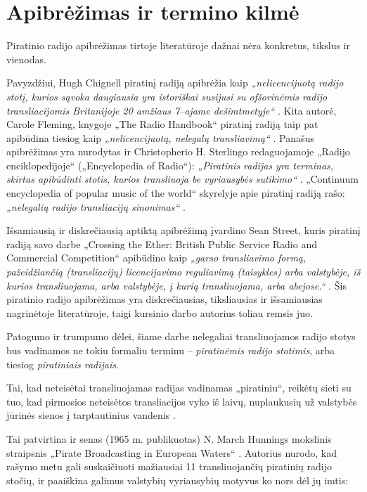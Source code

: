 \documentclass[kursinis-darbas]{vukf}
\begin{document}
\section{Apibrėžimas ir termino kilmė}

Piratinio radijo apibrėžimas tirtoje literatūroje dažnai nėra konkretus, tikslus ir vienodas.

Pavyzdžiui, Hugh Chignell piratinį radiją apibrėžia kaip \emph{„nelicencijuotą radijo stotį, kurios sąvoka daugiausia yra istoriškai susijusi su ofšorinėmis radijo transliacijomis Britanijoje 20 amžiaus 7--ajame dešimtmetyje“} \cite[p.~137]{hc_key_concepts_in_radio_studies}. Kita autorė, Carole Fleming, knygoje „The Radio Handbook“ piratinį radiją taip pat apibūdina tiesiog kaip \emph{„nelicencijuotą, nelegalų transliavimą“} \cite[p.~35]{cf_the_radio_handbook}. Panašus apibrėžimas yra nurodytas ir Christopherio H. Sterlingo redaguojamoje „Radijo enciklopedijoje“ („Encyclopedia of Radio“): \emph{„Piratinis radijas yra terminas, skirtas apibūdinti stotis, kurios transliuoja be vyriausybės sutikimo“} \cite[p.~237]{chs_encyclopedia_of_radio}. „Continuum encyclopedia of popular music of the world“ skyrelyje apie piratinį radiją rašo: \emph{„nelegalių radijo transliacijų sinonimas“} \cite[p.~447]{js_continuum_encyclopedia}.

Išsamiausią ir diskrečiausią aptiktą apibrėžimą įvardino Sean Street, kuris piratinį radiją savo darbe „Crossing the Ether: British Public Service Radio and Commercial Competition“ apibūdino kaip \emph{„garso transliavimo formą, pažeidžiančią (transliacijų) licencijavimo reguliavimą (taisykles) arba valstybėje, iš kurios transliuojama, arba valstybėje, į kurią transliuojama, arba abejose.“} \cite[p.206]{ss_crossing_the_ether_british_public_service_radio_and_commercial_competition}. Šis piratinio radijo apibrėžimas yra diskrečiausias, tiksliausias ir išsamiausias nagrinėtoje literatūroje, taigi kursinio darbo autorius toliau remsis juo.

Patogumo ir trumpumo dėlei, šiame darbe nelegaliai transliuojamos radijo stotys bus vadinamos ne tokiu formaliu terminu – \emph{piratinėmis radijo stotimis}, arba tiesiog \emph{piratiniais radijais}.

Tai, kad neteisėtai transliuojamas radijas vadinamas „piratiniu“, reikėtų sieti su tuo, kad pirmosios neteisėtos transliacijos vyko iš laivų, nuplaukusių už valstybės jūrinės sienos į tarptautinius vandenis \cite[p.~447]{js_continuum_encyclopedia}.

Tai patvirtina ir senas (1965 m. publikuotas) N. March Hunnings mokslinis straipsnis „Pirate Broadcasting in European Waters“ \cite[p.~412]{nmh_pirate_broadcasting_in_european_waters_1965}. Autorius nurodo, kad rašymo metu gali suskaičiuoti mažiausiai 11 transliuojančių piratinių radijo stočių, ir paaiškina galimus valstybių vyriausybių motyvus ko nors dėl jų imtis:
\end{document}
